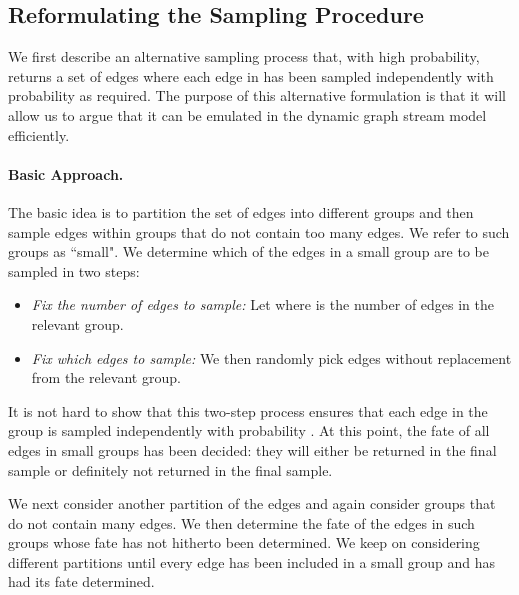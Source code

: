 \documentclass[11pt]{article}
\begin{document}
\subsection{Reformulating the Sampling Procedure}

We first describe an alternative sampling process that, with high probability, returns a set of edges  where each edge in  has been sampled independently with probability  as required. The purpose of this alternative formulation is that it will allow us to argue that it can be emulated in the dynamic graph stream  model efficiently.

\paragraph{Basic Approach.} 
The basic idea is to partition the set of edges into different groups and then sample edges within groups that do not contain too many edges. We refer to such groups as ``small". We determine which of the edges in a small group are to be sampled in two steps:
\begin{itemize}
\item {\em Fix the number  of edges to sample:} Let  where  is the number of edges in the relevant group.
\item {\em Fix which  edges to sample:} We then randomly pick  edges without replacement from the relevant group.
\end{itemize}
It is not hard to show that this two-step process ensures that each edge in the group is sampled independently with probability . At this point, the fate of all edges in small groups has been decided: they will either be returned in the final sample or definitely not returned in the final sample. 

We next consider another partition of the edges and again consider groups that do not contain many edges. We then determine the fate of the edges in such groups whose fate has not hitherto  been  determined. We keep on considering different partitions until every edge has been included in a small group and has had its fate determined. 
\end{document}
